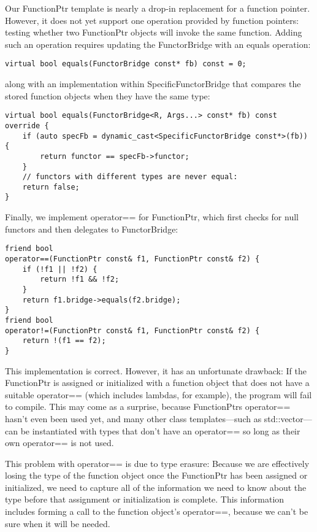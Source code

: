 Our FunctionPtr template is nearly a drop-in replacement for a function pointer. However, it does not yet support one operation provided by function pointers: testing whether two FunctionPtr objects will invoke the same function. Adding such an operation requires updating the FunctorBridge with an equals operation:

\begin{lstlisting}[style=styleCXX]
virtual bool equals(FunctorBridge const* fb) const = 0;
\end{lstlisting}

along with an implementation within SpecificFunctorBridge that compares the stored function objects when they have the same type:

\begin{lstlisting}[style=styleCXX]
virtual bool equals(FunctorBridge<R, Args...> const* fb) const override {
	if (auto specFb = dynamic_cast<SpecificFunctorBridge const*>(fb)) {
		return functor == specFb->functor;
	}
	// functors with different types are never equal:
	return false;
}
\end{lstlisting}

Finally, we implement operator== for FunctionPtr, which first checks for null functors and then delegates to FunctorBridge:

\begin{lstlisting}[style=styleCXX]
friend bool
operator==(FunctionPtr const& f1, FunctionPtr const& f2) {
	if (!f1 || !f2) {
		return !f1 && !f2;
	}
	return f1.bridge->equals(f2.bridge);
}
friend bool
operator!=(FunctionPtr const& f1, FunctionPtr const& f2) {
	return !(f1 == f2);
}
\end{lstlisting}

This implementation is correct. However, it has an unfortunate drawback: If the FunctionPtr is assigned or initialized with a function object that does not have a suitable operator== (which includes lambdas, for example), the program will fail to compile. This may come as a surprise, because FunctionPtrs operator== hasn’t even been used yet, and many other class templates—such as std::vector—can be instantiated with types that don’t have an operator== so long as their own operator== is not used.

This problem with operator== is due to type erasure: Because we are effectively losing the type of the function object once the FunctionPtr has been assigned or initialized, we need to capture all of the information we need to know about the type before that assignment or initialization is complete. This information includes forming a call to the function object’s operator==, because we can’t be sure when it will be needed.

